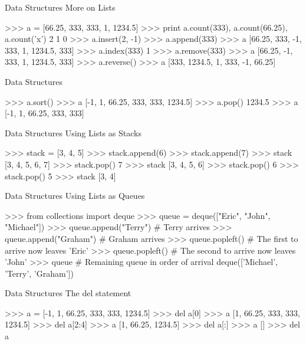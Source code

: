 \documentclass[11pt]{beamer}
\begin{document}
\begin{frame}[containsverbatim]{Data Structures}
More on Lists
\begin{python}
>>> a = [66.25, 333, 333, 1, 1234.5]
>>> print a.count(333), a.count(66.25), a.count('x')
2 1 0
>>> a.insert(2, -1)
>>> a.append(333)
>>> a
[66.25, 333, -1, 333, 1, 1234.5, 333]
>>> a.index(333)
1
>>> a.remove(333)
>>> a
[66.25, -1, 333, 1, 1234.5, 333]
>>> a.reverse()
>>> a
[333, 1234.5, 1, 333, -1, 66.25]
\end{python}
\end{frame}


\begin{frame}[containsverbatim]{Data Structures}
\begin{python}
>>> a.sort()
>>> a
[-1, 1, 66.25, 333, 333, 1234.5]
>>> a.pop()
1234.5
>>> a
[-1, 1, 66.25, 333, 333]
\end{python}
\end{frame}


\begin{frame}[containsverbatim]{Data Structures}
Using Lists as Stacks
\begin{python}
>>> stack = [3, 4, 5]
>>> stack.append(6)
>>> stack.append(7)
>>> stack
[3, 4, 5, 6, 7]
>>> stack.pop()
7
>>> stack
[3, 4, 5, 6]
>>> stack.pop()
6
>>> stack.pop()
5
>>> stack
[3, 4]
\end{python}
\end{frame}


\begin{frame}[containsverbatim]{Data Structures}
Using Lists as Queues
\begin{python}
>>> from collections import deque
>>> queue = deque(["Eric", "John", "Michael"])
>>> queue.append("Terry")           # Terry arrives
>>> queue.append("Graham")          # Graham arrives
>>> queue.popleft()                 # The first to arrive now leaves
'Eric'
>>> queue.popleft()                 # The second to arrive now leaves
'John'
>>> queue                      # Remaining queue in order of arrival
deque(['Michael', 'Terry', 'Graham'])
\end{python}
\end{frame}


\begin{frame}[containsverbatim]{Data Structures}
The del statement
\begin{python}
>>> a = [-1, 1, 66.25, 333, 333, 1234.5]
>>> del a[0]
>>> a
[1, 66.25, 333, 333, 1234.5]
>>> del a[2:4]
>>> a
[1, 66.25, 1234.5]
>>> del a[:]
>>> a
[]
>>> del a
\end{python}
\end{frame}
\end{document}
